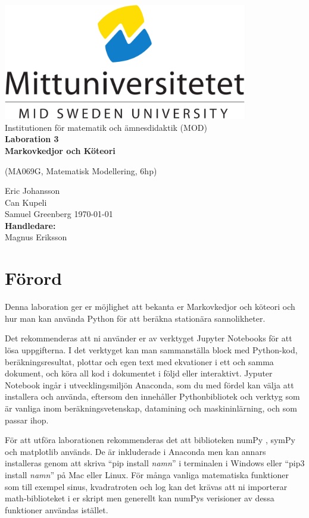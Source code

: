 \documentclass[a4paper]{article}
\newcommand{\getauthor}{Eric Johansson\\
                        Can Kupeli\\
                        Samuel Greenberg} %
\newcommand{\gettitle}{Laboration 3 \\ Markovkedjor och Köteori} %
\newcommand{\getcourse}{(MA069G, Matematisk Modellering, 6hp)} %
\newcommand{\getsupervisor}{Magnus Eriksson}
\begin{document}
\begin{titlepage}
  \begin{center}
    \vspace*{1cm}
    \includegraphics[width=0.8\textwidth]{msu.png}\\[0.5cm]
    \Large
    Institutionen för matematik och ämnesdidaktik (MOD)\\[1cm]
    \Huge
    \textbf{\gettitle}

    \large
    \getcourse{}

    \vspace{1cm}
    \getauthor{}
    \vfill
    \vspace{0.8cm}
    \small
    \today \\
    \Large
    \textbf{Handledare:}\\
    \getsupervisor{}
  \end{center}
\end{titlepage}

\tableofcontents
\newpage

\section{Förord}
Denna laboration ger er möjlighet att bekanta er Markovkedjor och köteori
och hur man kan använda Python för att beräkna stationära sannolikheter.

Det rekommenderas att ni använder er av verktyget Jupyter Notebooks för att lösa
uppgifterna. I det verktyget kan man sammanställa block med Python-kod, beräkningsresultat,
plottar och egen text med ekvationer i ett och samma dokument, och köra all kod i dokumentet
i följd eller interaktivt. Jyputer Notebook ingår i utvecklingsmiljön Anaconda, som du med
fördel kan välja att installera och använda, eftersom den innehåller Pythonbibliotek och
verktyg som är vanliga inom beräkningsvetenskap, datamining och maskininlärning, och som passar ihop.

För att utföra laborationen rekommenderas det att biblioteken numPy \cite{numpy-main},
symPy \cite{sympy-main} och matplotlib \cite{matplotlib-main} används. De är inkluderade i Anaconda men kan annars installeras genom att
skriva ``pip install \textit{namn}'' i terminalen i Windows eller ``pip3 install \textit{namn}'' på Mac eller Linux.
För många vanliga matematiska funktioner som till
exempel sinus, kvadratroten och log kan det krävas att ni importerar math-biblioteket i er skript men generellt kan numPys
verisioner av dessa funktioner användas istället.
\end{document}
